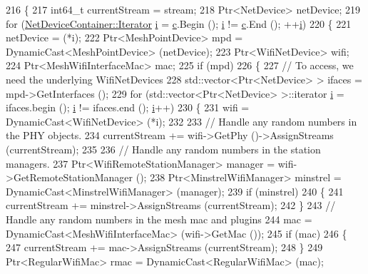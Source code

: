 \begin{DoxyCode}
216 \{
217   int64\_t currentStream = stream;
218   Ptr<NetDevice> netDevice;
219   \textcolor{keywordflow}{for} (\hyperlink{classns3_1_1NetDeviceContainer_a45709bb572f975569ed985fa89b132f8}{NetDeviceContainer::Iterator} \hyperlink{bernuolliDistribution_8m_a6f6ccfcf58b31cb6412107d9d5281426}{i} = \hyperlink{lte_2model_2fading-traces_2fading__trace__generator_8m_ae0323a9039add2978bf5b49550572c7c}{c}.Begin (); 
      \hyperlink{bernuolliDistribution_8m_a6f6ccfcf58b31cb6412107d9d5281426}{i} != \hyperlink{lte_2model_2fading-traces_2fading__trace__generator_8m_ae0323a9039add2978bf5b49550572c7c}{c}.End (); ++\hyperlink{bernuolliDistribution_8m_a6f6ccfcf58b31cb6412107d9d5281426}{i})
220     \{
221       netDevice = (*i);
222       Ptr<MeshPointDevice> mpd = DynamicCast<MeshPointDevice> (netDevice);
223       Ptr<WifiNetDevice> wifi;
224       Ptr<MeshWifiInterfaceMac> mac;
225       \textcolor{keywordflow}{if} (mpd)
226         \{
227           \textcolor{comment}{// To access, we need the underlying WifiNetDevices}
228           std::vector<Ptr<NetDevice> > ifaces = mpd->GetInterfaces ();
229           \textcolor{keywordflow}{for} (std::vector<Ptr<NetDevice> >::iterator \hyperlink{bernuolliDistribution_8m_a6f6ccfcf58b31cb6412107d9d5281426}{i} = ifaces.begin (); \hyperlink{bernuolliDistribution_8m_a6f6ccfcf58b31cb6412107d9d5281426}{i} != ifaces.end (); 
      \hyperlink{bernuolliDistribution_8m_a6f6ccfcf58b31cb6412107d9d5281426}{i}++)
230             \{
231               wifi = DynamicCast<WifiNetDevice> (*i);
232            
233               \textcolor{comment}{// Handle any random numbers in the PHY objects.}
234               currentStream += wifi->GetPhy ()->AssignStreams (currentStream);
235 
236               \textcolor{comment}{// Handle any random numbers in the station managers.}
237               Ptr<WifiRemoteStationManager> manager = wifi->GetRemoteStationManager ();
238               Ptr<MinstrelWifiManager> minstrel = DynamicCast<MinstrelWifiManager> (manager);
239               \textcolor{keywordflow}{if} (minstrel)
240                 \{
241                   currentStream += minstrel->AssignStreams (currentStream);
242                 \}
243               \textcolor{comment}{// Handle any random numbers in the mesh mac and plugins}
244               mac = DynamicCast<MeshWifiInterfaceMac> (wifi->GetMac ());
245               \textcolor{keywordflow}{if} (mac)
246                 \{
247                   currentStream += mac->AssignStreams (currentStream);
248                 \}
249               Ptr<RegularWifiMac> rmac = DynamicCast<RegularWifiMac> (mac);

\end{DoxyCode}
